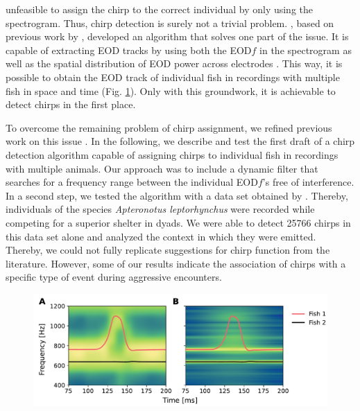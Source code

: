 unfeasible to assign the chirp to the correct individual by only using the spectrogram. Thus, chirp detection is surely not a trivial problem. \textcite{raab2022AdvancesNoninvasiveTracking}, based on previous work by \textcite{henningerTrackingActivityPatterns2020}, developed an algorithm that solves one part of the issue. It is capable of extracting EOD tracks by using both the EOD$f$ in the spectrogram as well as the spatial distribution of EOD power across electrodes \parencite{raab2022AdvancesNoninvasiveTracking}. This way, it is possible to obtain the EOD track of individual fish in recordings with multiple fish in space and time (Fig. \ref{fig:introplot}). Only with this groundwork, it is achievable to detect chirps in the first place. 

\vspace{\baselineskip}

To overcome the remaining problem of chirp assignment, we refined previous work on this issue \parencite{henningerStatisticsNaturalCommunication2018}. In the following, we describe and test the first draft of a chirp detection algorithm capable of assigning chirps to individual fish in recordings with multiple animals. Our approach was to include a dynamic filter that searches for a frequency range between the individual EOD$f$'s free of interference. In a second step, we tested the algorithm with a data set obtained by \textcite{raabElectrocommunicationSignalsIndicate2021}. Thereby, individuals of the species \textit{Apteronotus leptorhynchus} were recorded while competing for a superior shelter in dyads. We were able to detect 25766 chirps in this data set alone and analyzed the context in which they were emitted. Thereby, we could not fully replicate suggestions for chirp function from the literature. However, some of our results indicate the association of chirps with a specific type of event during aggressive encounters.

\begin{figure}[H]
    \centering
    \includegraphics[width=1\linewidth]{figures/introplot.pdf}

    \label{fig:introplot}
\end{figure}

